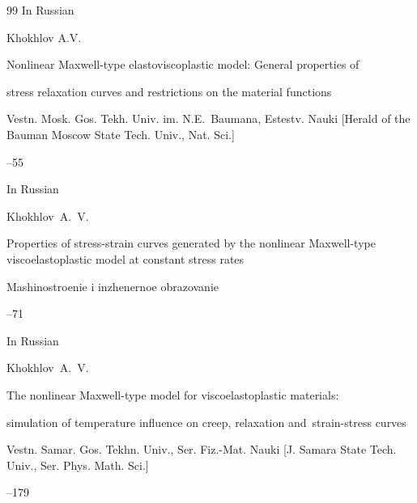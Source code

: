 \begin{thebibliography}{99}
\lang In Russian

\by Khokhlov  A.V. 

\paper Nonlinear  Maxwell-type  elastoviscoplastic  model:  General  properties  of  

stress relaxation curves and restrictions on the material functions

\jour  Vestn. Mosk. Gos. Tekh.  Univ.  im.  N.E.~Baumana,  Estestv.  Nauki \rm   [Herald  of  the  Bauman  Moscow  State  Tech.  Univ.,  Nat. Sci.]



--55







\lang In Russian

\by Khokhlov~A.~V.

\paper  Properties of stress-strain curves generated by the nonlinear Maxwell-type viscoelastoplastic model at constant stress rates

\jour Mashinostroenie i inzhenernoe obrazovanie



--71







\lang In Russian

\by Khokhlov~A.~V.

\paper The nonlinear Maxwell-type model for viscoelastoplastic materials:

simulation of temperature influence on creep, relaxation and~strain-stress curves

\jour Vestn. Samar. Gos. Tekhn. Univ., Ser. Fiz.-Mat. Nauki \rm [J. Samara State Tech. Univ., Ser. Phys. Math. Sci.]




--179








\end{thebibliography}

